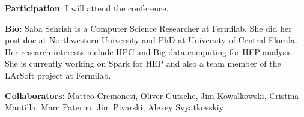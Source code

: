 \documentclass[11pt, twocolumn]{article}
\newcommand{\squeezeup}{\vspace{-5.5mm}}
\begin{document}
\begin{enumerate}
%
%

\end{enumerate}
\squeezeup
\textbf{Participation}: I will attend the conference. 

\textbf{Bio:} 
Saba Sehrish is a Computer Science Researcher 
at Fermilab. She did her post doc at Northwestern University
and PhD at University of Central Florida. 
Her research interests include HPC and Big data computing for HEP analysis.  
She is currently working on Spark for HEP and also a team member of the LArSoft 
project at Fermilab. 

\textbf{Collaborators: } 
Matteo Cremonesi, Oliver Gutsche, Jim Kowalkowski, 
Cristina Mantilla, Marc Paterno, Jim Pivarski, Alexey Svyatkovskiy
\squeezeup
\scriptsize


\end{document}
